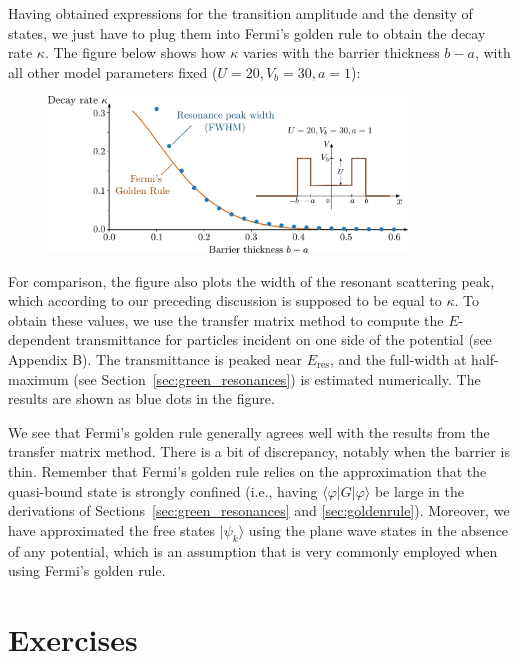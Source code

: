 \documentclass[pra,12pt]{revtex4}
\begin{document}
Having obtained expressions for the transition amplitude and the
density of states, we just have to plug them into Fermi's golden rule
to obtain the decay rate $\kappa$.  The figure below shows how
$\kappa$ varies with the barrier thickness $b-a$, with all other model
parameters fixed ($U = 20, V_b = 30, a = 1$):

\begin{figure}[h]
  \centering\includegraphics[width=0.85\textwidth]{goldenrule}
\end{figure}

For comparison, the figure also plots the width of the resonant
scattering peak, which according to our preceding discussion is
supposed to be equal to $\kappa$.  To obtain these values, we use the
transfer matrix method to compute the $E$-dependent transmittance for
particles incident on one side of the potential (see Appendix B).  The
transmittance is peaked near $E_{\mathrm{res}}$, and the full-width at
half-maximum (see Section~\ref{sec:green_resonances}) is estimated
numerically.  The results are shown as blue dots in the figure.

We see that Fermi's golden rule generally agrees well with the results
from the transfer matrix method.  There is a bit of discrepancy,
notably when the barrier is thin.  Remember that Fermi's golden rule
relies on the approximation that the quasi-bound state is strongly
confined (i.e., having $\langle \varphi|G|\varphi\rangle$ be large in
the derivations of Sections~\ref{sec:green_resonances} and
\ref{sec:goldenrule}).  Moreover, we have approximated the free states
$|\psi_k\rangle$ using the plane wave states in the absence of any
potential, which is an assumption that is very commonly employed when
using Fermi's golden rule.



\section*{Exercises}
\end{document}
